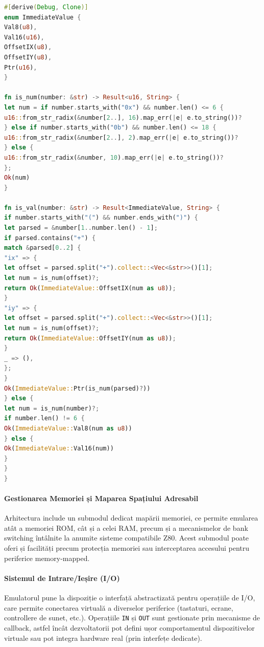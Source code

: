 \documentclass[titlepage,12pt]{article}
\begin{document}
\begin{lstlisting}[language=Rust,caption={Enumerator ImmediateValue},label={lst:immediatevalue-enum}]
#[derive(Debug, Clone)]
enum ImmediateValue {
Val8(u8),
Val16(u16),
OffsetIX(u8),
OffsetIY(u8),
Ptr(u16),
}

fn is_num(number: &str) -> Result<u16, String> {
let num = if number.starts_with("0x") && number.len() <= 6 {
u16::from_str_radix(&number[2..], 16).map_err(|e| e.to_string())?
} else if number.starts_with("0b") && number.len() <= 18 {
u16::from_str_radix(&number[2..], 2).map_err(|e| e.to_string())?
} else {
u16::from_str_radix(&number, 10).map_err(|e| e.to_string())?
};
Ok(num)
}

fn is_val(number: &str) -> Result<ImmediateValue, String> {
if number.starts_with("(") && number.ends_with(")") {
let parsed = &number[1..number.len() - 1];
if parsed.contains("+") {
match &parsed[0..2] {
"ix" => {
let offset = parsed.split("+").collect::<Vec<&str>>()[1];
let num = is_num(offset)?;
return Ok(ImmediateValue::OffsetIX(num as u8));
}
"iy" => {
let offset = parsed.split("+").collect::<Vec<&str>>()[1];
let num = is_num(offset)?;
return Ok(ImmediateValue::OffsetIY(num as u8));
}
_ => (),
};
}
Ok(ImmediateValue::Ptr(is_num(parsed)?))
} else {
let num = is_num(number)?;
if number.len() != 6 {
Ok(ImmediateValue::Val8(num as u8))
} else {
Ok(ImmediateValue::Val16(num))
}
}
}
\end{lstlisting}

\paragraph{Gestionarea Memoriei și Maparea Spațiului Adresabil}

Arhitectura include un submodul dedicat mapării memoriei, ce permite emularea atât a memoriei ROM, cât și a celei RAM, precum și a mecanismelor de bank switching întâlnite la anumite sisteme compatibile Z80. Acest submodul poate oferi și facilități precum protecția memoriei sau interceptarea accesului pentru periferice memory-mapped.

\paragraph{Sistemul de Intrare/Ieșire (I/O)}

Emulatorul pune la dispoziție o interfață abstractizată pentru operațiile de I/O, care permite conectarea virtuală a diverselor periferice (tastaturi, ecrane, controllere de sunet, etc.). Operațiile \texttt{IN} și \texttt{OUT} sunt gestionate prin mecanisme de callback, astfel încât dezvoltatorii pot defini ușor comportamentul dispozitivelor virtuale sau pot integra hardware real (prin interfețe dedicate).
\end{document}
